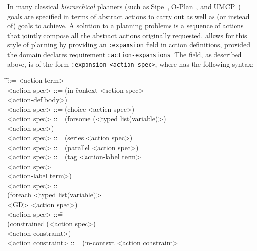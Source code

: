In many classical {\em hierarchical} 
planners (such as Sipe~\cite{wilkins88}, O-Plan~\cite{currie-oplan},
and UMCP~\cite{erol-aips-94}) goals are specified in terms of abstract actions to
carry out as well as (or instead of) goals to achieve.  A solution to a
planning problems is a sequence of actions that jointly compose all the abstract
actions originally requested.  \lang{} allows for this style of planning by
providing an {\tt :expansion} field in action definitions, provided the domain
declares requirement {\tt :action-expansions}.  The field, as described
above, is of the form {\tt :expansion <action spec>}, where {\tt <action spec>}
has the following syntax:
\begin{nopagebreak}\begin{tabtt}
\bump \=<action spec> \bump \= ::= <action-term> \+\\
   <action spec> \> ::= (in-\=context <action spec> \+\+ \\
                                <action-def body>) \-\-\\
   <action spec> \> ::= (choice <action spec>\zom) \\
   <action spec> \> ::= (for\=some (<typed list(variable)>\zom) \+\+\\
                                 <action spec>)\-\-\\
   <action spec> \> ::= (series <action spec>\zom) \\
   <action spec> \> ::= (parallel <action spec>\zom) \\
   <action spec> \> ::= (tag \= <action-label term>\zom \+\+\\
                                  <action spec> \\
                                  <action-label term>\zom) \-\-\\
   <action spec> \> ::=\= \+\+\\
                            (foreach \=<typed list(variable)> \+\\
                                     <GD> <action spec>) \-\-\-\\
   <action spec> \> ::=\= \+\+\\
                             (con\=strained (<action spec>\oom) \+\\
                                <action constraint>\zom) \-\-\-\\
   <action constraint> \> ::= (in-\=context <action constraint> \+\+ \\

\end{tabtt}
\end{nopagebreak}
